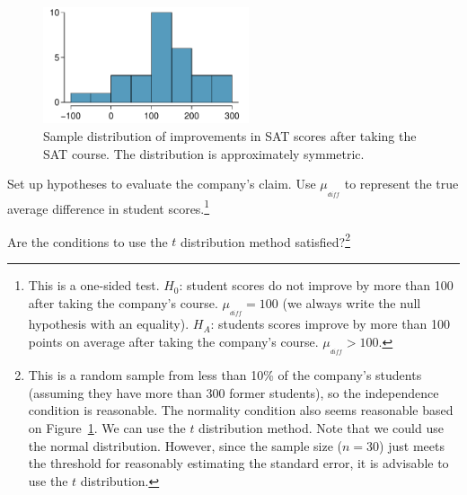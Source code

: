 \begin{figure}[h]
\centering
\includegraphics[width=0.54\textwidth]{05/figures/satImprovementHTDataHistogram/satImprovementHTDataHistogram}
\caption{Sample distribution of improvements in SAT scores after taking the SAT course. The distribution is approximately symmetric.}
\label{satImprovementHTDataHistogram}
\end{figure}

\begin{exercise}
Set up hypotheses to evaluate the company's claim. Use $\mu_{_{diff}}$ to represent the true average difference in student scores.\footnote{This is a one-sided test. $H_0$: student scores do not improve by more than 100 after taking the company's course. $\mu_{_{diff}} = 100$ (we always write the null hypothesis with an equality). $H_A$: students scores improve by more than 100 points on average after taking the company's course. $\mu_{_{diff}} > 100$.}
\end{exercise}

\begin{exercise}
Are the conditions to use the $t$ distribution method satisfied?\footnote{This is a random sample from less than 10\% of the company's students (assuming they have more than 300 former students), so the independence condition is reasonable. The normality condition also seems reasonable based on Figure~\ref{satImprovementHTDataHistogram}. We can use the $t$ distribution method. Note that we could use the normal distribution. However, since the sample size ($n=30$) just meets the threshold for reasonably estimating the standard error, it is advisable to use the $t$ distribution.}
\end{exercise}

